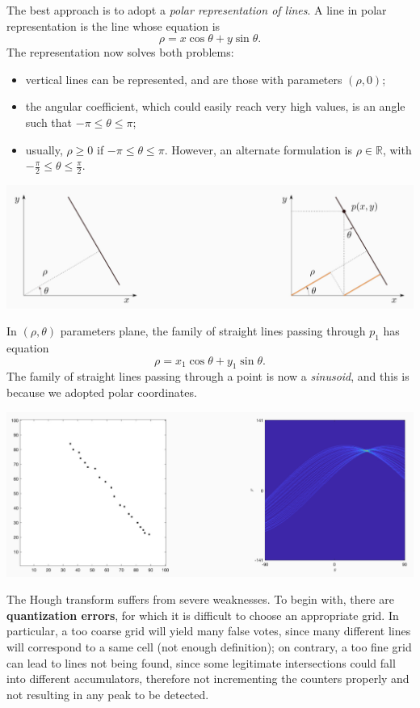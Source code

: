 \documentclass[10pt]{report}
\begin{document}
The best approach is to adopt a \emph{polar representation of lines}. A line
in polar representation is the line whose equation is
\[\rho = x\cos \theta + y \sin \theta.\] The representation now solves both
problems:

\begin{itemize}
\item vertical lines can be represented, and are those with parameters
\((\rho, 0)\);
\item the angular coefficient, which could easily reach very high
values, is an angle such that \(-\pi \leq \theta \leq \pi\);
\item usually, \(\rho \geq 0\) if \(-\pi \leq \theta \leq \pi\). However, an
alternate formulation is \(\rho \in \mathbb{R}\), with
\(-\frac \pi 2 \leq \theta \leq \frac \pi 2\).
\end{itemize}

\begin{center}
\includegraphics[width=.9\linewidth]{./pics/fit/hough-polar.jpg}
\end{center}

In \((\rho, \theta)\) parameters plane, the family of straight lines
passing through \(p_1\) has equation
\[\rho = x_1 \cos \theta + y_1 \sin \theta.\] The family of straight
lines passing through a point is now a \emph{sinusoid}, and this is because
we adopted polar coordinates.

\begin{center}
\includegraphics[width=.9\linewidth]{./pics/fit/hough-sinusoid.jpg}
\end{center}

The Hough transform suffers from severe weaknesses. To begin with, there
are \textbf{quantization errors}, for which it is difficult to choose an
appropriate grid. In particular, a too coarse grid will yield many false
votes, since many different lines will correspond to a same cell (not
enough definition); on contrary, a too fine grid can lead to lines not
being found, since some legitimate intersections could fall into
different accumulators, therefore not incrementing the counters properly
and not resulting in any peak to be detected.
\end{document}
